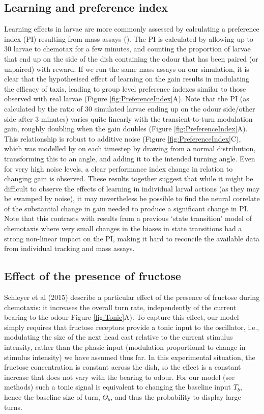\documentclass[11pt,a4paper]{article}
\begin{document}
\subsection{Learning and preference index}
Learning effects in larvae are more commonly assessed by calculating a preference index (PI) resulting from mass assays (\citep{gerber2009smelling}). The PI is calculated by allowing up to 30 larvae to chemotax for a few minutes, and counting the proportion of larvae that end up on the side of the dish containing the odour that has been paired (or unpaired) with reward. If we run the same mass assays on our simulation, it is clear that the hypothesised effect of learning on the gain results in modulating the efficacy of taxis, leading to group level preference indexes similar to those observed with real larvae (Figure \ref{fig:PreferenceIndex}A). Note that the PI (as calculated by the ratio of 30 simulated larvae ending up on the odour side/other side after 3 minutes) varies quite linearly with the transient-to-turn modulation gain, roughly doubling when the gain doubles (Figure \ref{fig:PreferenceIndex}A). This relationship is robust to additive noise (Figure \ref{fig:PreferenceIndex}C), which was modelled by on each timestep by drawing from a normal distribution, transforming this to an angle, and adding it to the intended turning angle. Even for very high noise levels, a clear performance index change in relation to changing gain is observed. These results together suggest that while it might be difficult to observe the effects of learning in individual larval actions (as they may be swamped by noise), it may nevertheless be possible to find the neural correlate of the substantial change in gain needed to produce a significant change in PI.
Note that this contrasts with results from a previous `state transition' model of chemotaxis \citep{davies2015model} where very small changes in the biases in state transitions had a strong non-linear impact on the PI, making it hard to reconcile the available data from individual tracking and mass assays.

\subsection{Effect of the presence of fructose}
Schleyer et al (2015) describe a particular effect of the presence of fructose during chemotaxis: it increases the overall turn rate, independently of the current bearing to the odour Figure \ref{fig:Tonic}A). To capture this effect, our model simply requires that fructose receptors provide a tonic input to the oscillator, i.e., modulating the size of the next head cast relative to the current stimulus intensity, rather than the phasic input (modulation proportional to change in stimulus intensity) we have assumed thus far. In this experimental situation, the fructose concentration is constant across the dish, so the effect is a constant increase that does not vary with the bearing to odour. For our model (see methods) such a tonic signal is equivalent to changing the baseline input $T_b$, hence the baseline size of turn, $\Theta_b$, and thus the probability to display large turns. 
\end{document}
